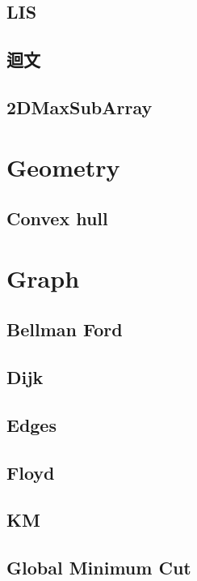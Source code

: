     \subsection{LIS}
        
    \subsection{迴文}
        
    \subsection{2DMaxSubArray}
        

\section{Geometry}
    \subsection{Convex hull}
        

\section{Graph}
    \subsection{Bellman Ford}
        
    \subsection{Dijk}
        
    \subsection{Edges}
            
    \subsection{Floyd}
        
    \subsection{KM}
        
    \subsection{Global Minimum Cut}
        
